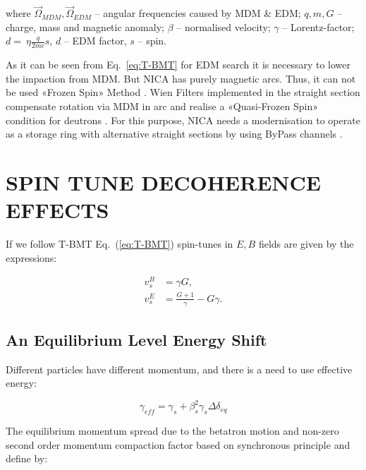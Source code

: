 \documentclass[a4paper,
               keeplastbox,   %
               ]{jacow}
\begin{document}
\par where $\vec{\Omega}_{MDM}, \vec{\Omega}_{EDM}$ – angular frequencies caused by MDM \& EDM; $q, m, G$ – charge, mass and magnetic anomaly; $\beta$ – normalised velocity; $\gamma$ – Lorentz-factor; $d =~\eta \frac{q}{2mc}s$, $d$ – EDM factor, $s$ – spin.

\par As it can be seen from Eq.~\ref{eq:T-BMT} for EDM search it is necessary to lower the impaction from MDM. But NICA has purely magnetic arcs. Thus, it can not be used «Frozen Spin» Method \cite{FS}. Wien Filters implemented in the straight section compensate rotation via MDM in arc and realise a «Quasi-Frozen Spin» condition for deutrons \cite{QFS}. For this purpose, NICA needs a modernisation to operate as a storage ring with alternative straight sections by using ByPass channels \cite{ByPass}.

\section{SPIN TUNE DECOHERENCE EFFECTS}

\par If we follow T-BMT Eq.~(\ref{eq:T-BMT}) spin-tunes in $E, B$ fields are given by the expressions:

\begin{equation}\label{eq:spintune}
\begin{aligned}
v_s^B & =\gamma G, \\
v_s^E & = \frac{G+1}{\gamma}-G \gamma .
\end{aligned}
\end{equation}

\subsection{An Equilibrium Level Energy Shift}

\par Different particles have different momentum, and there is a need to use effective energy:

\par \begin{equation}\label{eq:gamma_eff}
\gamma_{eff} = \gamma_{s}+\beta_{s}^2 \gamma_{s} \Delta \delta_{e q}
\end{equation}

\par The equilibrium momentum spread due to the betatron motion and non-zero second order momentum compaction factor based on synchronous principle \cite{Decoherence} and define by:
\end{document}
